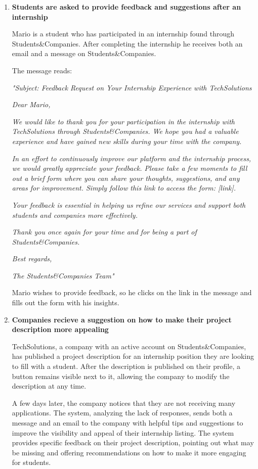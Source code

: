 \begin{enumerate}
    

    \item \textbf{Students are asked to provide feedback and suggestions after an internship}

    Mario is a student who has participated in an internship found through Students\&Companies. After completing the internship he receives both an email and a message on Students\&Companies.

    The message reads:

    \textit{"Subject: Feedback Request on Your Internship Experience with TechSolutions}

    \textit{Dear Mario,}

    \textit{We would like to thank you for your participation in the internship with TechSolutions through Students\&Companies. We hope you had a valuable experience and have gained new skills during your time with the company.}

    \textit{In an effort to continuously improve our platform and the internship process, we would greatly appreciate your feedback. Please take a few moments to fill out a brief form where you can share your thoughts, suggestions, and any areas for improvement. Simply follow this link to access the form: [link].}

    \textit{Your feedback is essential in helping us refine our services and support both students and companies more effectively.}

    \textit{Thank you once again for your time and for being a part of Students\&Companies.}

    \textit{Best regards,}
    
    \textit{The Students\&Companies Team"}

    Mario wishes to provide feedback, so he clicks on the link in the message and fills out the form with his insights.

    \item \textbf{Companies recieve a suggestion on how to make their project description more appealing}

    TechSolutions, a company with an active account on Students\&Companies, has published a project description for an internship position they are looking to fill with a student. After the description is published on their profile, a button remains visible next to it, allowing the company to modify the description at any time.

    A few days later, the company notices that they are not receiving many applications. The system, analyzing the lack of responses, sends both a message and an email to the company with helpful tips and suggestions to improve the visibility and appeal of their internship listing. The system provides specific feedback on their project description, pointing out what may be missing and offering recommendations on how to make it more engaging for students.


\end{enumerate}
